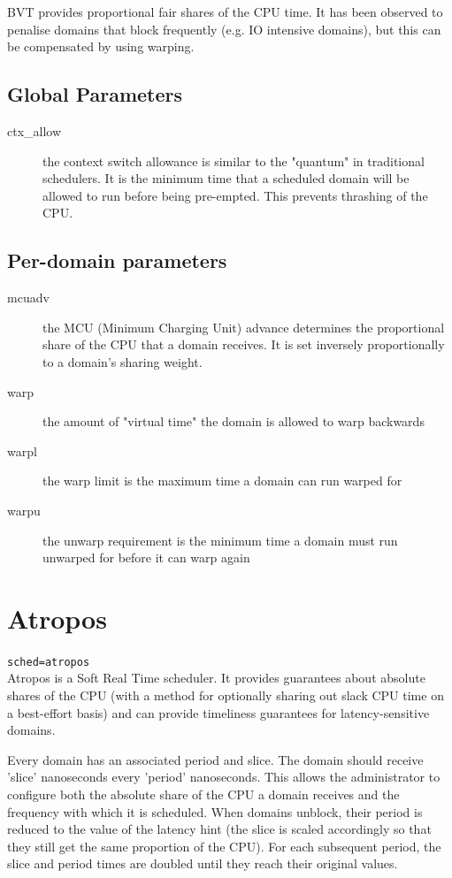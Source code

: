 \documentclass[11pt,twoside,final,openright]{xenstyle}
\begin{document}
{BVT provides proportional fair shares of the CPU time.  It has been
observed to penalise domains that block frequently (e.g. IO intensive
domains), but this can be compensated by using warping. 

\subsection{Global Parameters}

\begin{description}
\item[ctx\_allow]
  the context switch allowance is similar to the "quantum"
  in traditional schedulers.  It is the minimum time that
  a scheduled domain will be allowed to run before being
  pre-empted.  This prevents thrashing of the CPU.
\end{description}

\subsection{Per-domain parameters}

\begin{description}
\item[mcuadv]
  the MCU (Minimum Charging Unit) advance determines the
  proportional share of the CPU that a domain receives.  It
  is set inversely proportionally to a domain's sharing weight.
\item[warp]
  the amount of "virtual time" the domain is allowed to warp
  backwards
\item[warpl]
  the warp limit is the maximum time a domain can run warped for
\item[warpu]
  the unwarp requirement is the minimum time a domain must
  run unwarped for before it can warp again
\end{description}

\section{Atropos}

{\tt sched=atropos } \\

Atropos is a Soft Real Time scheduler.  It provides guarantees about
absolute shares of the CPU (with a method for optionally sharing out
slack CPU time on a best-effort basis) and can provide timeliness
guarantees for latency-sensitive domains.

Every domain has an associated period and slice.  The domain should
receive 'slice' nanoseconds every 'period' nanoseconds.  This allows
the administrator to configure both the absolute share of the CPU a
domain receives and the frequency with which it is scheduled.  When
domains unblock, their period is reduced to the value of the latency
hint (the slice is scaled accordingly so that they still get the same
proportion of the CPU).  For each subsequent period, the slice and
period times are doubled until they reach their original values.

}
\end{document}
